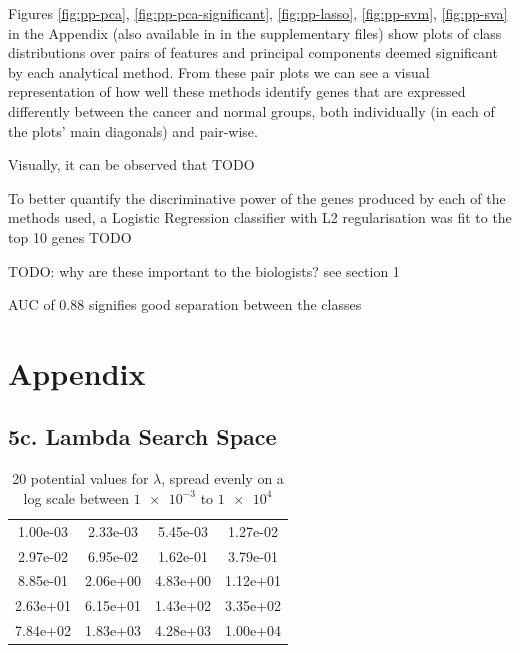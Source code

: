 \documentclass[twocolumn]{article}
\begin{document}
Figures \ref{fig:pp-pca}, \ref{fig:pp-pca-significant}, \ref{fig:pp-lasso}, \ref{fig:pp-svm}, \ref{fig:pp-sva} in the Appendix (also available in  in the supplementary files) show plots of class distributions over pairs of features and principal components deemed significant by each analytical method. From these pair plots we can see a visual representation of how well these methods identify genes that are expressed differently between the cancer and normal groups, both individually (in each of the plots' main diagonals) and pair-wise.

Visually, it can be observed that TODO

To better quantify the discriminative power of the genes produced by each of the methods used, a Logistic Regression classifier with L2 regularisation was fit to the top 10 genes TODO

TODO: why are these important to the biologists? see section 1

AUC of 0.88 signifies good separation between the classes

\newpage
\printbibliography[
    heading=bibintoc,
    title={References}
]

\newpage
\onecolumn
\section{Appendix}
\subsection{5c. Lambda Search Space}
\begin{table}[H]
    \centering
    \begin{tabular}{cccc}
        1.00e-03& 2.33e-03& 5.45e-03& 1.27e-02 \\
        2.97e-02& 6.95e-02& 1.62e-01& 3.79e-01 \\
        8.85e-01& 2.06e+00& 4.83e+00& 1.12e+01 \\
        2.63e+01& 6.15e+01& 1.43e+02& 3.35e+02 \\
        7.84e+02& 1.83e+03& 4.28e+03& 1.00e+04 \\
    \end{tabular}
    \caption{20 potential values for $\lambda$, spread evenly on a log scale between $\num{1e-3}$ to $\num{1e4}$}
    \label{tab:lambda-search-space}
\end{table}
\end{document}

